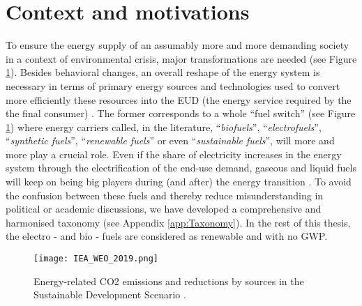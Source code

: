 \section*{Context and motivations}

To ensure the energy supply of an assumably more and more demanding society in a context of environmental crisis, major transformations are needed (see Figure \ref{fig:intro:IEA_WEO_2019}). Besides behavioral changes, an overall reshape of the energy system is necessary in terms of primary energy sources and technologies used to convert more efficiently these resources into the \gls{EUD} (\ie the energy service required by the the final consumer) \cite{iea2020world,luderer2018residual}. The former corresponds to a whole ``fuel switch'' (see Figure \ref{fig:intro:IEA_WEO_2019}) where energy carriers called, in the literature, ``\emph{biofuels}'', ``\emph{electrofuels}'', ``\emph{synthetic fuels}'', ``\emph{renewable fuels}'' or even ``\emph{sustainable fuels}'', will more and more play a crucial role. Even if the share of electricity increases in the energy system through the electrification of the end-use demand, gaseous and liquid fuels will keep on being big players during (and after) the energy transition \cite{Ahlgren2012}. To avoid the confusion between these fuels and thereby reduce misunderstanding in political or academic discussions, we have developed a comprehensive and harmonised taxonomy (see Appendix \ref{app:Taxonomy}). In the rest of this thesis, the electro - and bio - fuels are considered as renewable and with no \gls{GWP}.  

\begin{figure}[ht!]
\centering
\texttt{[image: IEA\_WEO\_2019.png]}
\caption{Energy-related CO2 emissions and reductions by sources in the Sustainable Development Scenario \cite{iea2020world}.}
\label{fig:intro:IEA_WEO_2019}
\end{figure}

